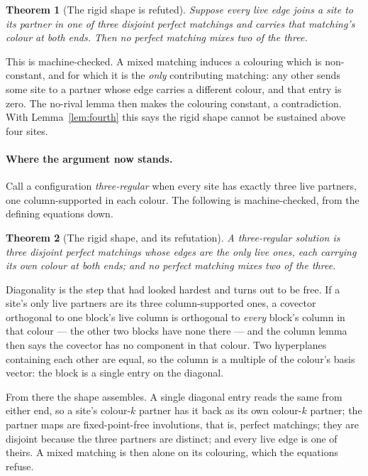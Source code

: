 \documentclass[11pt]{article}
\newtheorem{theorem}{Theorem}[section]
\theoremstyle{definition}
\theoremstyle{remark}
\begin{document}
\begin{theorem}[The rigid shape is refuted]\label{thm:mixed}
Suppose every live edge joins a site to its partner in one of three disjoint perfect
matchings and carries that matching's colour at both ends. Then no perfect matching mixes
two of the three.
\end{theorem}

This is machine-checked. A mixed matching induces a colouring which is non-constant, and
for which it is the \emph{only} contributing matching: any other sends some site to a
partner whose edge carries a different colour, and that entry is zero. The no-rival lemma
then makes the colouring constant, a contradiction. With Lemma~\ref{lem:fourth} this says
the rigid shape cannot be sustained above four sites.

\paragraph{Where the argument now stands.} Call a configuration \emph{three-regular} when
every site has exactly three live partners, one column-supported in each colour. The
following is machine-checked, from the defining equations down.

\begin{theorem}[The rigid shape, and its refutation]\label{thm:threereg}
A three-regular solution is three disjoint perfect matchings whose edges are the only live
ones, each carrying its own colour at both ends; and no perfect matching mixes two of the
three.
\end{theorem}

Diagonality is the step that had looked hardest and turns out to be free. If a site's only
live partners are its three column-supported ones, a covector orthogonal to one block's
live column is orthogonal to \emph{every} block's column in that colour --- the other two
blocks have none there --- and the column lemma then says the covector has no component in
that colour. Two hyperplanes containing each other are equal, so the column is a multiple
of the colour's basis vector: the block is a single entry on the diagonal.

From there the shape assembles. A single diagonal entry reads the same from either end, so
a site's colour-$k$ partner has it back as its own colour-$k$ partner; the partner maps are
fixed-point-free involutions, that is, perfect matchings; they are disjoint because the
three partners are distinct; and every live edge is one of theirs. A mixed matching is then
alone on its colouring, which the equations refuse.
\end{document}
